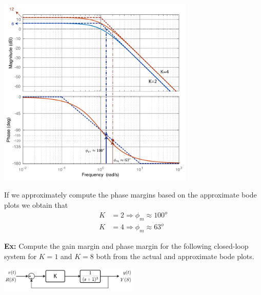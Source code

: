 \documentclass[twoside]{article}
\begin{document}
\begin{center}
\begin{minipage}[h]{\linewidth}
    \begin{center}
      \includegraphics[width=0.7\textwidth]{margin}
    \end{center}
\end{minipage}
\end{center}

If we approximately compute the phase margins based
on the approximate bode plots we obtain that 
%
\begin{align*}
  K &= 2 \Rightarrow \phi_m \approx 100^o 
  \\
  K &= 4 \Rightarrow \phi_m \approx 63^o 
\end{align*}

\vspace{12pt}

\textbf{Ex:} Compute the gain margin and phase margin 
for the following closed-loop system for $K = 1$ and $K = 8$
both from the actual and approximate bode plots. 

\begin{center}
\begin{minipage}[h]{\linewidth}
    \begin{center}
      \includegraphics[width=0.5\textwidth]{ex3block}
    \end{center}
\end{minipage}
\end{center}
\end{document}
